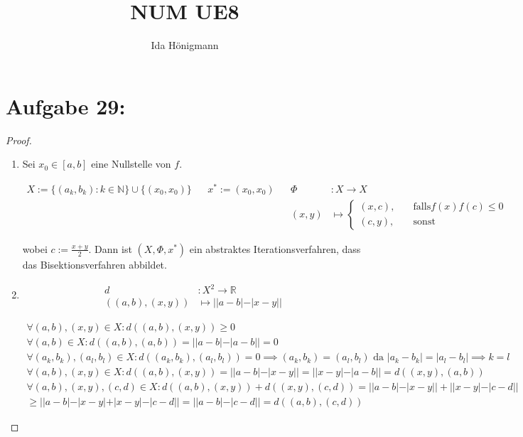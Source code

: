 \documentclass[]{article}
\title{NUM UE8}
\author{Ida Hönigmann}
\begin{document}
\maketitle

\section{Aufgabe 29:}

\begin{proof}
	\begin{enumerate}[label=\alph*)]
		\item 
		
		Sei $x_0 \in [a,b]$ eine Nullstelle von $f$.
		
		\begin{align*}
			X := \{(a_k, b_k): k \in \mathbb{N}\} \cup \{(x_0, x_0)\} && x^* := (x_0, x_0) && \Phi &: X \rightarrow X \\
			&& && (x, y) &\mapsto \begin{cases}
				(x, c), &\quad\text{falls} f(x)f(c)\le 0 \\
				(c, y), &\quad\text{sonst}
			\end{cases}
		\end{align*}
		
		wobei $c:=\frac{x+y}{2}$. Dann ist $(X, \Phi, x^*)$ ein abstraktes Iterationsverfahren, dass das Bisektionsverfahren abbildet.
		
		\item
		
		\begin{align*}
			d &:X^2\rightarrow\mathbb{R} \\
			((a,b),(x,y))&\mapsto ||a - b| - |x - y||
		\end{align*}
		
		\begin{align*}
			\forall (a,b), (x,y) \in X: d((a,b),(x,y))\geq 0\\
			\forall (a,b) \in X: d((a,b),(a,b)) = ||a - b| - |a - b|| = 0\\
			\forall (a_k,b_k), (a_l,b_l) \in X: d((a_k,b_k),(a_l,b_l))=0 \implies (a_k,b_k) = (a_l,b_l) \text{ da }|a_k-b_k|=|a_l-b_l| \implies k=l\\
			\forall (a,b), (x,y) \in X: d((a,b),(x,y)) = ||a - b| - |x - y|| = ||x - y| - |a - b|| = d((x,y),(a,b))\\
			\forall (a,b), (x,y), (c,d) \in X: d((a,b),(x,y)) + d((x,y), (c,d)) = ||a - b| - |x - y|| + ||x - y| - |c - d|| \\
			\geq ||a - b| - |x - y| + |x - y| - |c - d|| = ||a - b| - |c - d|| = d((a,b), (c,d))
		\end{align*}
		

\end{enumerate}
\end{proof}
\end{document}
